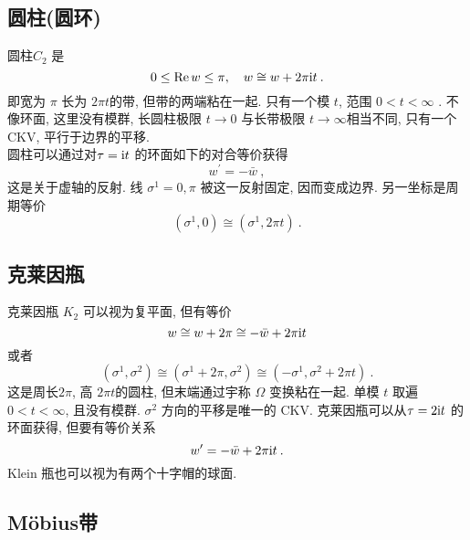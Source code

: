 \subsection*{圆柱(圆环)}

圆柱$C_{2}$ 是
\begin{equation}
	0 \leq \operatorname{Re} w \leq \pi, \quad w \cong w+2 \pi \mathrm{i} t \:. \label{7.1.5}
\end{equation}
即宽为 $\pi$ 长为 $2 \pi t$的带, 但带的两端粘在一起. 只有一个模 $t$, 范围 $0<t<\infty $ . 不像环面, 这里没有模群, 长圆柱极限 $t \rightarrow 0$ 与长带极限 $t \rightarrow \infty$相当不同, 只有一个CKV, 平行于边界的平移. \\

圆柱可以通过对$\tau=\mathrm{i} t$ 的环面如下的对合等价获得
\begin{equation}
	w^{\prime}=-\bar{w} \:, \label{7.1.6}
\end{equation}
这是关于虚轴的反射. 线 $\sigma^{1}=0, \pi$ 被这一反射固定, 因而变成边界. 另一坐标是周期等价
\begin{equation}
  (\sigma^{1}, 0) \cong(\sigma^{1}, 2 \pi t) \:. \label{7.1.7}
\end{equation}


\subsection*{克莱因瓶}

克莱因瓶 $K_{2}$ 可以视为复平面, 但有等价
\begin{equation}
	w \cong w+2 \pi \cong-\bar{w}+2 \pi \mathrm{i} t \label{7.1.8}
\end{equation}
或者
\begin{equation}
	(\sigma^{1}, \sigma^{2}) \cong (\sigma^{1}+2 \pi, \sigma^{2}) \cong (-\sigma^{1}, \sigma^{2}+2 \pi t) \:. \label{7.1.9}
\end{equation}
这是周长$2 \pi$, 高 $2 \pi t$的圆柱, 但末端通过宇称 $\Omega$ 变换粘在一起.  单模 $t$ 取遍 $0<t<\infty$, 且没有模群. 
$\sigma^{2}$ 方向的平移是唯一的 CKV. 克莱因瓶可以从$\tau=2 \mathrm{i} t$ 的环面获得, 但要有等价关系
\begin{equation}
	w^{\prime}=-\bar{w}+2 \pi \mathrm{i} t \:. \label{7.1.10}
\end{equation}
Klein 瓶也可以视为有两个十字帽的球面.

\subsection*{M\"{o}bius带}

